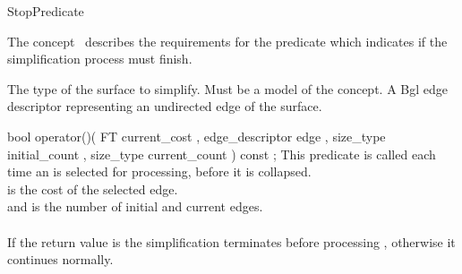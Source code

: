 
\begin{ccRefConcept}{StopPredicate}


\ccDefinition

The concept \ccRefName\ describes the requirements for the predicate which indicates if the simplification process must finish.

\ccTypes
  {The type of the surface to simplify. Must be a model of the  concept.}{}
\ccGlue    
\ccGlue    
\ccGlue    
  {A {\sc Bgl} edge descriptor representing an undirected edge of the surface.}

\ccCreation
{}  %

\ccOperations

  \ccMethod
    {bool  operator()( FT              current_cost
                     , edge_descriptor edge
                     , size_type       initial_count
                     , size_type       current_count
                     ) const ;
    }
    {
    This predicate is called each time an  is selected for processing,
     before it is collapsed.\\
     is the cost of the selected edge.\\
     and  is the number of initial and current edges.\\
    \\
    If the return value is  the simplification terminates before processing ,
    otherwise it continues normally.
    }
  
\ccHasModels
{}

\end{ccRefConcept}

